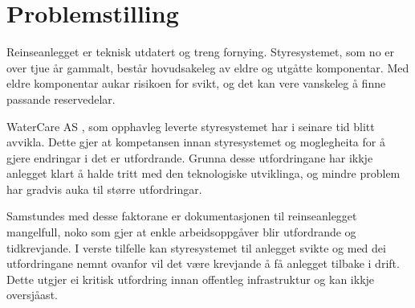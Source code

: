 \section{Problemstilling}
Reinseanlegget er teknisk utdatert og treng fornying. Styresystemet, som no er over tjue år gammalt,
består hovudsakeleg av eldre og utgåtte komponentar. Med eldre komponentar aukar risikoen for svikt, 
og det kan vere vanskeleg å finne passande reservedelar.

WaterCare AS \citep{WaterCare}, som opphavleg leverte styresystemet har i seinare tid blitt avvikla. 
Dette gjer at kompetansen innan styresystemet og moglegheita for å gjere endringar i det er utfordrande.
Grunna desse utfordringane har ikkje anlegget klart å halde tritt med den teknologiske utviklinga, 
og mindre problem har gradvis auka til større utfordringar.

Samstundes med desse faktorane er dokumentasjonen til reinseanlegget mangelfull, noko som gjer at enkle arbeidsoppgåver blir utfordrande og tidkrevjande.
I verste tilfelle kan styresystemet til anlegget svikte og med dei utfordringane nemnt ovanfor vil det være krevjande
å få anlegget tilbake i drift. \newline 
Dette utgjer ei kritisk utfordring innan offentleg infrastruktur og kan ikkje oversjåast.
\newline

